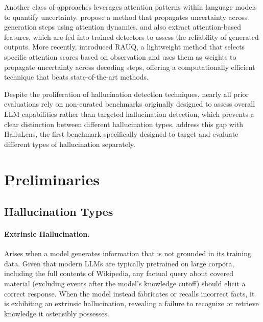 \documentclass[letterpaper]{article} %
\begin{document}
Another class of approaches leverages attention patterns within language models to quantify uncertainty. \citet{zhang2023enhancinguncertaintybasedhallucinationdetection} propose a method that propagates uncertainty across generation steps using attention dynamics. \citet{vazhentsev2024unconditionaltruthfulnesslearningconditional} and \citet{chuang2024lookbacklensdetectingmitigating} also extract attention-based features, which are fed into trained detectors to assess the reliability of generated outputs.
More recently, \citet{vazhentsev2025uncertaintyawareattentionheadsefficient} introduced RAUQ, a lightweight method that selects specific attention scores based on observation and uses them as weights to propagate uncertainty across decoding steps, offering a computationally efficient technique that beats state-of-the-art methods.

Despite the proliferation of hallucination detection techniques, nearly all prior evaluations rely on non‑curated benchmarks originally designed to assess overall LLM capabilities rather than targeted hallucination detection, which prevents a clear distinction between different hallucination types. \citet{bang2025hallulensllmhallucinationbenchmark} address this gap with HalluLens, the first benchmark specifically designed to target and evaluate different types of hallucination separately.


\section{Preliminaries}

\subsection{Hallucination Types}
\paragraph{Extrinsic Hallucination.}Arises when a model generates information that is not grounded in its training data. Given that modern LLMs are typically pretrained on large corpora, including the full contents of Wikipedia, any factual query about covered material (excluding events after the model’s knowledge cutoff) should elicit a correct response. When the model instead fabricates or recalls incorrect facts, it is exhibiting an extrinsic hallucination, revealing a failure to recognize or retrieve knowledge it ostensibly possesses.
\end{document}
